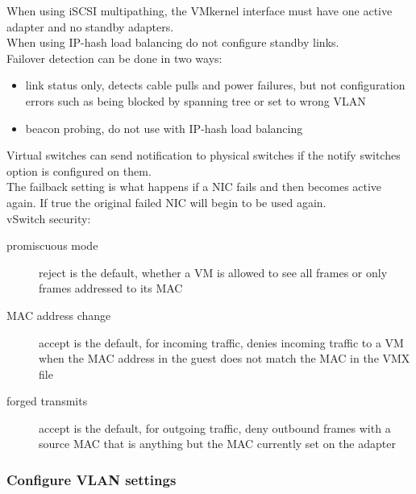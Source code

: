 When using iSCSI multipathing, the VMkernel interface must have one active
adapter and no standby adapters.\\

When using IP-hash load balancing do not configure standby links.\\

Failover detection can be done in two ways:

\begin{itemize}

\item link status only, detects cable pulls and power failures, but not
configuration errors such as being blocked by spanning tree or set to wrong
VLAN

\item beacon probing, do not use with IP-hash load balancing

\end{itemize}

Virtual switches can send notification to physical switches if the notify
switches option is configured on them.\\

The failback setting is what happens if a NIC fails and then becomes active
again. If true the original failed NIC will begin to be used again.\\

vSwitch security:

\begin{description}

\item[promiscuous mode]
reject is the default, whether a VM is allowed to see all frames or only
frames addressed to its MAC

\item[MAC address change]
accept is the default, for incoming traffic, denies incoming traffic to a VM
when the MAC address in the guest does not match the MAC in the VMX file

\item[forged transmits]
accept is the default, for outgoing traffic, deny outbound frames with a
source MAC that is anything but the MAC currently set on the adapter

\end{description}

\subsubsection{Configure VLAN settings}

